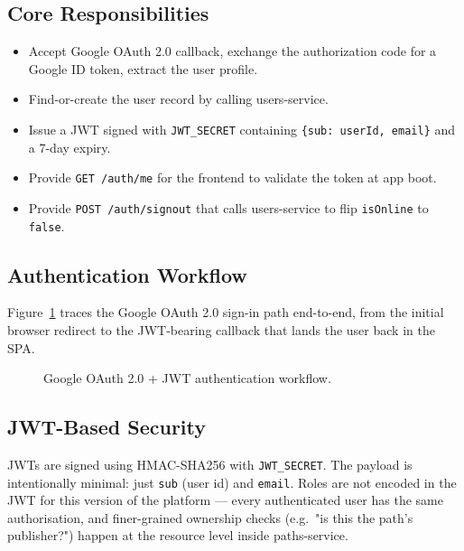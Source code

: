 \documentclass[11pt,a4paper]{article}
\begin{document}
\subsection{Core Responsibilities}
\begin{itemize}[leftmargin=*]
  \item Accept Google OAuth 2.0 callback, exchange the authorization
        code for a Google ID token, extract the user profile.
  \item Find-or-create the user record by calling users-service.
  \item Issue a JWT signed with \texttt{JWT\_SECRET} containing
        \texttt{\{sub: userId, email\}} and a 7-day expiry.
  \item Provide \texttt{GET /auth/me} for the frontend to validate
        the token at app boot.
  \item Provide \texttt{POST /auth/signout} that calls users-service
        to flip \texttt{isOnline} to \texttt{false}.
\end{itemize}

\subsection{Authentication Workflow}
Figure~\ref{fig:auth-flow} traces the Google OAuth 2.0 sign-in path
end-to-end, from the initial browser redirect to the JWT-bearing
callback that lands the user back in the SPA.

\begin{figure}[h]
\centering
{}
\caption{Google OAuth 2.0 + JWT authentication workflow.}
\label{fig:auth-flow}
\end{figure}

\subsection{JWT-Based Security}
JWTs are signed using HMAC-SHA256 with \texttt{JWT\_SECRET}.  The
payload is intentionally minimal: just \texttt{sub} (user id) and
\texttt{email}.  Roles are not encoded in the JWT for this version of
the platform — every authenticated user has the same authorisation,
and finer-grained ownership checks (e.g.\ "is this the path's
publisher?") happen at the resource level inside paths-service.
\end{document}
